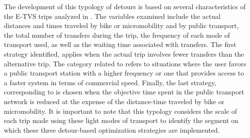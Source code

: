 \begin{refsegment}
The development of this typology of detours is based on several characteristics of the \acrshort{E-TVS} trips analyzed in . The variables examined include the actual distances and times traveled by bike or micromobility and by public transport, the total number of transfers during the trip, the frequency of each mode of transport used, as well as the waiting time associated with transfers. The first strategy identified,  applies when the actual trip involves fewer transfers than the alternative trip. The category related to  refers to situations where the user favors a public transport station with a higher frequency or one that provides access to a faster system in terms of commercial speed. Finally, the last strategy, corresponding to  is chosen when the objective time spent in the public transport network is reduced at the expense of the distance-time traveled by bike or micromobility. It is important to note that this typology considers the scale of each trip made using these light modes of transport to identify the segment on which these three detour-based optimization strategies are implemented.%


\end{refsegment}
